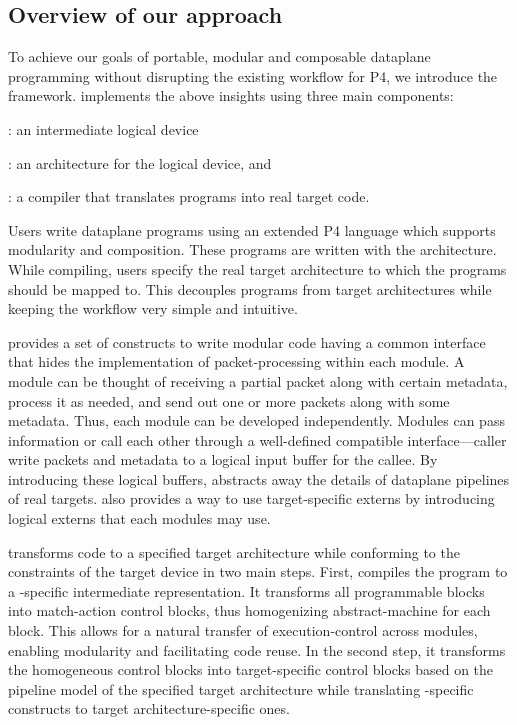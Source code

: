 \documentclass[letterpaper,twocolumn,10pt]{article}
\begin{document}
\subsection{Overview of our approach}
\label{sec:overview}

To achieve our goals of portable, modular and composable dataplane
programming without disrupting the existing workflow for P4, we
introduce the \ulang framework. \ulang implements the above insights
using three main components:
\begin{enumerate*}[label=(\roman*)]
  \item \uswitch: an intermediate logical device
  \item \uarch: an architecture for the logical device, and
  \item \ucomp: a compiler that translates \ulang programs into real
    target code.
\end{enumerate*}

Users write dataplane programs using an extended P4 language which
supports modularity and composition. These programs are written with
the \uarch architecture. While compiling, users specify the real
target architecture to which the \ulang programs should be mapped to.
This decouples programs from target architectures while keeping the
workflow very simple and intuitive.

\uarch provides a set of constructs to write modular code having a
common interface that hides the implementation of packet-processing
within each module. A module can be thought of receiving a partial
packet along with certain metadata, process it as needed, and send out
one or more packets along with some metadata. Thus, each module can be
developed independently. Modules can pass information or call each
other through a well-defined compatible interface---caller write
packets and metadata to a logical input buffer for the callee. By
introducing these logical buffers, \uswitch abstracts away the details
of dataplane pipelines of real targets. \uarch also provides a way to
use target-specific externs by introducing logical externs that each
modules may use.

\ucomp transforms \ulang code to a specified target architecture while
conforming to the constraints of the target device in two main steps.
First, \ucomp compiles the program to a \uarch-specific intermediate
representation. It transforms all programmable blocks into
match-action control blocks, thus homogenizing abstract-machine for
each block. This allows for a natural transfer of execution-control
across modules, enabling modularity and facilitating code reuse. In
the second step, it transforms the homogeneous control blocks into
target-specific control blocks based on the pipeline model of the
specified target architecture while translating \uarch-specific
constructs to target architecture-specific ones.
\end{document}
